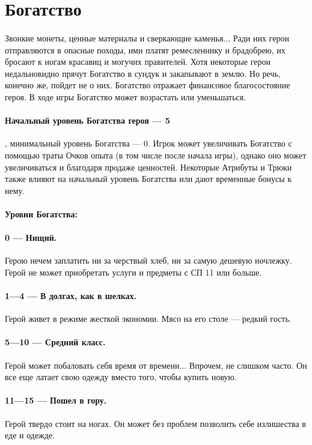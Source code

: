 \section{Богатство}
\paragraph{}
Звонкие монеты, ценные материалы и сверкающие каменья... Ради них герои отправляются в опасные походы, ими платят ремесленнику и брадобрею, их бросают к ногам красавиц и могучих правителей. Хотя некоторые герои недальновидно прячут Богатство в сундук и закапывают в землю. Но речь, конечно же, пойдет не о них.
\newline
Богатство отражает финансовое благосостояние героя. В ходе игры Богатство может возрастать или уменьшаться.
\paragraph{Начальный уровень Богатства героя — 5}, минимальный уровень Богатства — 0. Игрок может увеличивать Богатство с помощью траты Очков опыта (в том числе после начала игры), однако оно может увеличиваться и благодаря продаже ценностей. Некоторые Атрибуты и Трюки также влияют на начальный уровень Богатства или дают временные бонусы к нему.
\paragraph{Уровни Богатства:}
\paragraph{0 — Нищий.} Герою нечем заплатить ни за черствый хлеб, ни за самую дешевую ночлежку. Герой не может приобретать услуги и предметы с СП 11 или больше.
\paragraph{1—4 — В долгах, как в шелках.} Герой живет в режиме жесткой экономии. Мясо на его столе — редкий гость.
\paragraph{5—10 — Средний класс.} Герой может побаловать себя время от времени... Впрочем, не слишком часто. Он все еще латает свою одежду вместо того, чтобы купить новую.
\paragraph{11—15 — Пошел в гору.} Герой твердо стоит на ногах. Он может без проблем позволить себе излишества в еде и одежде.
